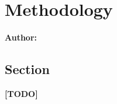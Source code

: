 \chapter{Methodology}

\textbf{Author: } 

\section{Section}
\textbf{[TODO]}
\newline
\lipsum[1]

\filbreak